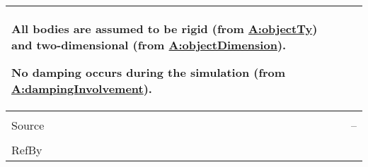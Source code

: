 \documentclass[12pt]{article}
\begin{document}
\begin{minipage}{\textwidth}
\begin{tabular}{>{\raggedright}p{}>{\raggedright\arraybackslash}p{}}
        All bodies are assumed to be rigid (from \hyperref[assumpOT]{A:objectTy}) and two-dimensional (from \hyperref[assumpOD]{A:objectDimension}).
        
        No damping occurs during the simulation (from \hyperref[assumpDI]{A:dampingInvolvement}).
        
\\ \midrule \\
Source & --
         
\\ \midrule \\
RefBy & 
\\ \bottomrule
\end{tabular}
\end{minipage}

\vspace{\baselineskip}
\noindent
\end{document}
